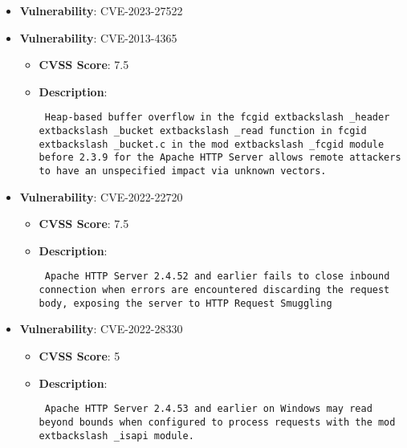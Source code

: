 \documentclass{article}
\begin{document}
\begin{itemize}
        \item \textbf{Vulnerability}: CVE-2023-27522
    
        \item \textbf{Vulnerability}: CVE-2013-4365
        \begin{itemize}
            \item \textbf{CVSS Score}:  7.5 
            \item \textbf{Description}: \parbox{\linewidth}{\texttt{ Heap-based buffer overflow in the fcgid	extbackslash _header	extbackslash _bucket	extbackslash _read function in fcgid	extbackslash _bucket.c in the mod	extbackslash _fcgid module before 2.3.9 for the Apache HTTP Server allows remote attackers to have an unspecified impact via unknown vectors. }}
        \end{itemize}
    
        \item \textbf{Vulnerability}: CVE-2022-22720
        \begin{itemize}
            \item \textbf{CVSS Score}:  7.5 
            \item \textbf{Description}: \parbox{\linewidth}{\texttt{ Apache HTTP Server 2.4.52 and earlier fails to close inbound connection when errors are encountered discarding the request body, exposing the server to HTTP Request Smuggling }}
        \end{itemize}
    
        \item \textbf{Vulnerability}: CVE-2022-28330
        \begin{itemize}
            \item \textbf{CVSS Score}:  5 
            \item \textbf{Description}: \parbox{\linewidth}{\texttt{ Apache HTTP Server 2.4.53 and earlier on Windows may read beyond bounds when configured to process requests with the mod	extbackslash _isapi module. }}
        \end{itemize}
    

\end{itemize}
\end{document}
